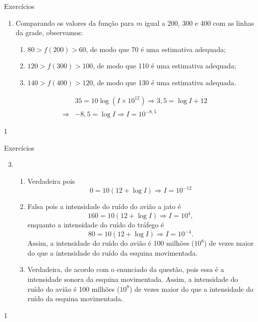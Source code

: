 \def\currentcolor{cor1}
\begin{answer}{Exercícios}
{
	\exerciselist
	\begin{enumerate}
	\item Comparando os valores da função para $m$ igual a 200, 300 e 400 com as linhas da grade, observamos:
	\begin{enumerate}
	\item $80>f(200)>60$, de modo que 70 é uma estimativa adequada;
	\item $120>f(300)>100$, de modo que 110 é uma estimativa adequada;
	\item $140>f(400)>120$, de modo que 130 é uma estimativa adequada.
	\end{enumerate}

	\Item 
	\begin{align*}
	& 35 = 10 \log(I \times 10^{12}) \Rightarrow   3{,}5 = \log I + 12\\
	\Rightarrow & -8{,}5 = \log I \Rightarrow I = 10^{-8{,}5}
	\end{align*}
	\end{enumerate}
}{1}
\end{answer}
\clearmargin
\begin{answer}{Exercícios}
{
	\exerciselist
	\begin{enumerate}\setcounter{enumi}{2}
	\Item 
	\begin{align*}
	& 80 = 120+10 \log I_1 \Rightarrow  -40 = 10\log I_1\\
	\Rightarrow & I_1 = 10^{-4},
	\end{align*}
	\begin{align*}
	& 60 = 120+10 \log I_2 \Rightarrow -60 = 10\log I_2\\
	\Rightarrow & I_2 = 10^{-6},
	\end{align*}
	Assim,
	$$
	\frac{I_1}{I_2}=\frac{10^{-4}}{10^{-6}}= 100.
	$$

	\Item
	\begin{align*}
	 20 =& N_1-N_2 = 120 +10\log I_1- (120 +10\log I_1) \\
	 =& 10\log I_1 - \log I_2 = 10\log (I_1/I_2)\\
	\Rightarrow I_1/I_2  =& 10^{2}
	\end{align*}

	\item
	\begin{enumerate}
	\item Verdadeira pois
	$$
	0 = 10(12+\log I) \Rightarrow I = 10^{-12}
	$$
	\item Falsa pois a intensidade do ruído do avião a jato é
	$$
	160 = 10(12+\log I) \Rightarrow I = 10^{4},
	$$
	enquanto a intensidade do ruído do tráfego é
	$$
	80 = 10(12+\log I) \Rightarrow I = 10^{-4}.
	$$
	Assim, a intensidade do ruído do avião é 100 milhões ($10^8$) de vezes maior do que a intensidade do ruído da esquina movimentada.
	\item Verdadeira, de acordo com o enunciado da questão, pois essa é a intensidade sonora da esquina movimentada.
	Assim, a intensidade do ruído do avião é 100 milhões ($10^8$) de vezes maior do que a intensidade do ruído da esquina movimentada.
	\end{enumerate}
	\end{enumerate}
}{1}
\end{answer}
